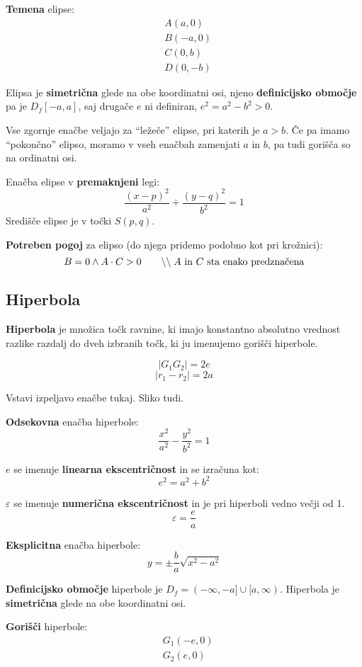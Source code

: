 \documentclass[a4paper,oneside,12pt,fleqn]{article}
\newcommand\krat\cdot
\newcommand{\comment}[1]{\ensuremath{\qquad\backslash\backslash\;}\textnormal{#1}}
\numberwithin{equation}{section}
\begin{document}
\textbf{Temena} elipse:
\begin{align*}
  &A(a,0) \\
  &B(-a, 0) \\
  &C(0, b) \\
  &D(0,-b)
\end{align*}

Elipsa je \textbf{simetrična} glede na obe koordinatni osi, njeno \textbf{definicijsko območje} pa je
$D_f[-a, a]$, saj drugače $e$ ni definiran, $e^2 = a^2 - b^2 > 0$.

Vse zgornje enačbe veljajo za ``ležeče'' elipse, pri katerih je $a > b$. Če pa imamo
``pokončno'' elipso, moramo v vseh enačbah zamenjati $a$ in $b$, pa tudi gorišča so na
ordinatni osi.

Enačba elipse v \textbf{premaknjeni} legi:
\[ \frac{(x-p)^2}{a^2} + \frac{(y-q)^2}{b^2} = 1 \]
Središče elipse je v točki $S(p,q)$.

\textbf{Potreben pogoj} za elipso (do njega pridemo podobno kot pri krožnici):
\[ B = 0 \land A \krat C > 0 \comment{$A$ in $C$ sta enako predznačena} \]

\subsection{Hiperbola}
\label{sec:hiper}
\textbf{Hiperbola} je množica točk ravnine, ki imajo konstantno absolutno vrednost razlike razdalj
do dveh izbranih točk, ki ju imenujemo gorišči hiperbole.

\[ |G_1G_2| = 2e \]
\[ |r_1 - r_2| = 2a \]

Vstavi izpeljavo enačbe tukaj. Sliko tudi.

\textbf{Odsekovna} enačba hiperbole:
\[ \frac{x^2}{a^2} - \frac{y^2}{b^2} = 1 \]

$e$ se imenuje \textbf{linearna ekscentričnost} in se izračuna kot:
\[ e^2 = a^2 + b^2 \]

$\varepsilon$ se imenuje \textbf{numerična ekscentričnost} in je pri hiperboli vedno večji od 1.
\[ \varepsilon = \frac{e}{a} \]

\textbf{Eksplicitna} enačba hiperbole:
\[ y = \pm \frac{b}{a} \sqrt{x^2 - a^2} \]

\textbf{Definicijsko območje} hiperbole je $D_f = (-\infty, -a] \cup [a, \infty)$.
Hiperbola je \textbf{simetrična} glede na obe koordinatni osi.

\textbf{Gorišči} hiperbole:
\begin{align*}
 &G_1(-e, 0) \\
 &G_2(e, 0)
\end{align*}
\end{document}
